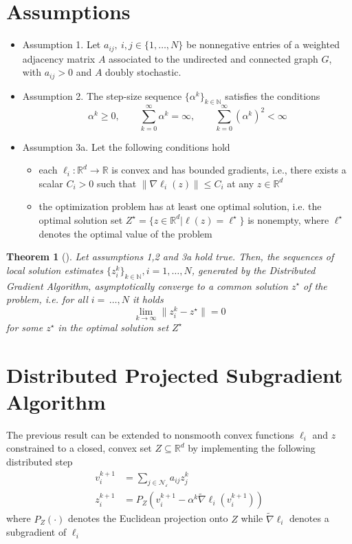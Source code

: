 \documentclass{book}
\newcommand{\R}{\mathbb{R}}
\newcommand{\N}{\mathbb{N}}
\theoremstyle{theoremv2}
\newtheorem{theorem}{Theorem}[chapter]
\theoremstyle{defv2}
\theoremstyle{remark}
\theoremstyle{remark}
\theoremstyle{definition}
\theoremstyle{definition}
\begin{document}
\section{Assumptions}
\begin{itemize}
    \item Assumption 1. Let $a_{ij},\ i,j \in \{1,\dots,N\}$ be nonnegative entries of a weighted adjacency matrix $A$ associated to the undirected and connected graph $G$, with $a_{ij}>0$ and $A$ doubly stochastic.
    \item Assumption 2. The step-size sequence $\{\alpha^k\}_{k\in\N}$ satisfies the conditions
        \[
            \alpha^k \geq 0, \qquad \displaystyle\sum_{k=0}^{\infty}\alpha^k = \infty, \qquad \displaystyle\sum_{k=0}^{\infty} (\alpha^k)^2 < \infty
        \]
    \item Assumption 3a. Let the following conditions hold 
        \begin{itemize}
            \item each $\ell_i:\R^d\to\R$ is convex and has bounded gradients, i.e., there exists a scalar $C_i>0$ such that $\|\nabla \ell_i(z)\|\leq C_i$ at any $z\in\R^d$
            \item the optimization problem has at least one optimal solution, i.e. the optimal solution set $Z^\star = \{z\in\R^d|\ell(z)=\ell^\star\}$ is nonempty, where $\ell^\star$ denotes the optimal value of the problem
        \end{itemize}
\end{itemize}
\begin{theorem}[]
    Let assumptions 1,2 and 3a hold true. Then, the sequences of local solution estimates $\{z_i^k\}_{k\in\N}, i=1,\dots,N$, generated by the Distributed Gradient Algorithm, asymptotically converge to a common solution $z^\star$ of the problem, i.e. for all $i=\,\dots,N$ it holds 
    \[
        \lim_{k\to\infty} \|z_i^k-z^\star\| = 0
    \]
    for some $z^\star$ in the optimal solution set $Z^\star$
\end{theorem}

\section{Distributed Projected Subgradient Algorithm}
The previous result can be extended to nonsmooth convex functions $\ell_i$ and $z$ constrained to a closed, convex set $Z\subseteq \R^d$ by implementing the following distributed step
\begin{align*}
    v_i^{k+1} &= \displaystyle\sum_{j\in\mathcal{N_i}}a_{ij} z_j^k \\
    z_i^{k+1} &= P_Z\left(v_i^{k+1} - \alpha^k \tilde{\nabla}\ell_i(v_i^{k+1})\right)
\end{align*}
where $P_Z(\cdot)$ denotes the Euclidean projection onto $Z$ while $\tilde\nabla\ell_i$ denotes a subgradient of $\ell_i$
\end{document}
